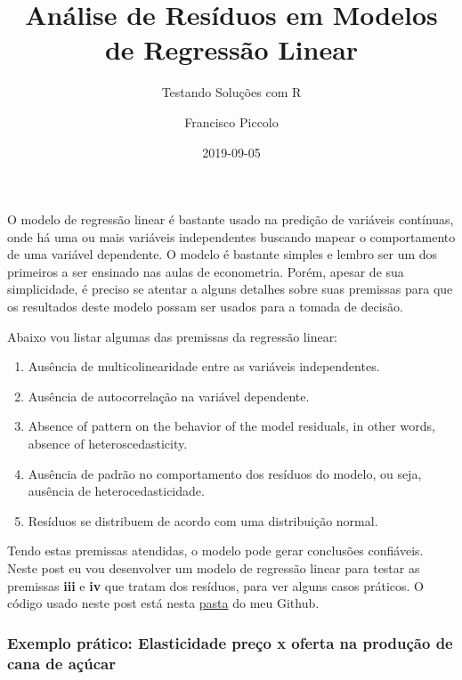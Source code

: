 \documentclass[
  12pt,
  a4paper,
]{article}
\title{Análise de Resíduos em Modelos de Regressão Linear}
\subtitle{Testando Soluções com R}
\author{Francisco Piccolo}
\date{2019-09-05}
\begin{document}
\maketitle

O modelo de regressão linear é bastante usado na predição de variáveis contínuas, onde há uma ou mais variáveis independentes buscando mapear o comportamento de uma variável dependente. O modelo é bastante simples e lembro ser um dos primeiros a ser ensinado nas aulas de econometria. Porém, apesar de sua simplicidade, é preciso se atentar a alguns detalhes sobre suas premissas para que os resultados deste modelo possam ser usados para a tomada de decisão.

Abaixo vou listar algumas das premissas da regressão linear:

\begin{enumerate}
\def\labelenumi{\roman{enumi})}
\item
  Ausência de multicolinearidade entre as variáveis independentes.
\item
  Ausência de autocorrelação na variável dependente.
\item
  Absence of pattern on the behavior of the model residuals, in other words, absence of heteroscedasticity.
\item
  Ausência de padrão no comportamento dos resíduos do modelo, ou seja, ausência de heterocedasticidade.
\item
  Resíduos se distribuem de acordo com uma distribuição normal.
\end{enumerate}

Tendo estas premissas atendidas, o modelo pode gerar conclusões confiáveis. Neste post eu vou desenvolver um modelo de regressão linear para testar as premissas \textbf{iii} e \textbf{iv} que tratam dos resíduos, para ver alguns casos práticos. O código usado neste post está nesta \href{https://github.com/FranciscoPiccolo/franciscopiccolo.github.io/blob/master/02.Posts_pdf/02.residual_analysis_in_econometric_models_20190905/article.Rmd}{pasta} do meu Github.

\hypertarget{exemplo-pruxe1tico-elasticidade-preuxe7o-x-oferta-na-produuxe7uxe3o-de-cana-de-auxe7uxfacar}{%
\subsubsection{Exemplo prático: Elasticidade preço x oferta na produção de cana de açúcar}\label{exemplo-pruxe1tico-elasticidade-preuxe7o-x-oferta-na-produuxe7uxe3o-de-cana-de-auxe7uxfacar}}
\end{document}

